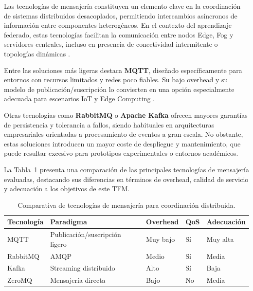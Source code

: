 \documentclass{report}
\begin{document}
Las tecnologías de mensajería constituyen un elemento clave en la coordinación de sistemas distribuidos desacoplados, permitiendo intercambios asíncronos de información entre componentes heterogéneos. En el contexto del aprendizaje federado, estas tecnologías facilitan la comunicación entre nodos Edge, Fog y servidores centrales, incluso en presencia de conectividad intermitente o topologías dinámicas \cite{kleppmann2017ddia}.

Entre las soluciones más ligeras destaca \textbf{MQTT}, diseñado específicamente para entornos con recursos limitados y redes poco fiables. Su bajo overhead y su modelo de publicación/suscripción lo convierten en una opción especialmente adecuada para escenarios IoT y Edge Computing \cite{banks2019mqtt}. 

Otras tecnologías como \textbf{RabbitMQ} o \textbf{Apache Kafka} ofrecen mayores garantías de persistencia y tolerancia a fallos, siendo habituales en arquitecturas empresariales orientadas a procesamiento de eventos a gran escala. No obstante, estas soluciones introducen un mayor coste de despliegue y mantenimiento, que puede resultar excesivo para prototipos experimentales o entornos académicos.

La Tabla~\ref{tab:comparativa-mensajeria} presenta una comparación de las principales tecnologías de mensajería evaluadas, destacando sus diferencias en términos de overhead, calidad de servicio y adecuación a los objetivos de este TFM.


\begin{table}[H]
\centering
\footnotesize
\caption{Comparativa de tecnologías de mensajería para coordinación distribuida.}
\label{tab:comparativa-mensajeria}
\renewcommand{\arraystretch}{1.2}
\setlength{\tabcolsep}{3pt}

\begin{tabularx}{\linewidth}{p{2.4cm} X p{1.8cm} p{1.4cm} p{2.4cm}}
\toprule
\textbf{Tecnología} & \textbf{Paradigma} & \textbf{Overhead} & \textbf{QoS} & \textbf{Adecuación} \\
\midrule
MQTT & Publicación/suscripción ligero & Muy bajo & Sí & Muy alta \\
RabbitMQ & AMQP & Medio & Sí & Media \\
Kafka & Streaming distribuido & Alto & Sí & Baja \\
ZeroMQ & Mensajería directa & Bajo & No & Media \\
\bottomrule
\end{tabularx}
\end{table}
\end{document}
